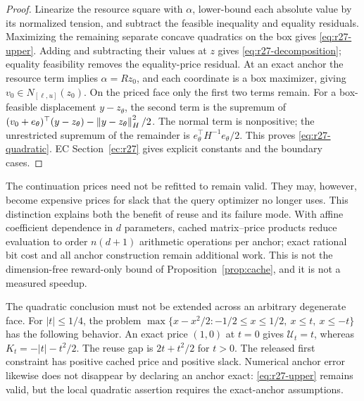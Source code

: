 \begin{proof}
Linearize the resource square with $\alpha$, lower-bound each absolute value by its normalized tension, and subtract the feasible inequality and equality residuals. Maximizing the remaining separate concave quadratics on the box gives \eqref{eq:r27-upper}. Adding and subtracting their values at $z$ gives \eqref{eq:r27-decomposition}; equality feasibility removes the equality-price residual. At an exact anchor the resource term implies $\alpha=Rz_0$, and each coordinate is a box maximizer, giving $v_0\in N_{[\ell,u]}(z_0)$. On the priced face only the first two terms remain. For a box-feasible displacement $y-z_\theta$, the second term is the supremum of
$(v_0+e_\theta)^\top(y-z_\theta)-\left\lVert y-z_\theta\right\rVert_H^2/2$.
The normal term is nonpositive; the unrestricted supremum of the remainder is $e_\theta^\top H^{-1}e_\theta/2$. This proves \eqref{eq:r27-quadratic}. EC Section~\ref{ec:r27} gives explicit constants and the boundary cases.\end{proof}

The continuation prices need not be refitted to remain valid. They may, however, become expensive prices for slack that the query optimizer no longer uses. This distinction explains both the benefit of reuse and its failure mode. With affine coefficient dependence in $d$ parameters, cached matrix--price products reduce evaluation to order $n(d+1)$ arithmetic operations per anchor; exact rational bit cost and all anchor construction remain additional work. This is not the dimension-free reward-only bound of Proposition~\ref{prop:cache}, and it is not a measured speedup.

The quadratic conclusion must not be extended across an arbitrary degenerate face. For $|t|\leq1/4$, the problem $\max\{x-x^2/2:-1/2\leq x\leq1/2,\ x\leq t,\ x\leq-t\}$ has the following behavior. An exact price $(1,0)$ at $t=0$ gives $\mathcal U_t=t$, whereas $K_t=-|t|-t^2/2$. The reuse gap is $2t+t^2/2$ for $t>0$. The released first constraint has positive cached price and positive slack. Numerical anchor error likewise does not disappear by declaring an anchor exact: \eqref{eq:r27-upper} remains valid, but the local quadratic assertion requires the exact-anchor assumptions.

